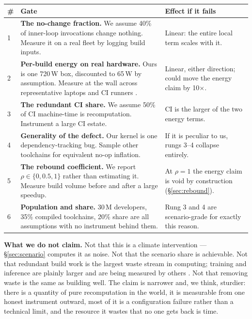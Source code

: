 \documentclass[11pt,a4paper]{article}
\providecommand{\textcite}[1]{\cite{#1}}
\begin{document}
\begin{center}\small{}\begin{tabularx}{\textwidth}{@{}lXl@{}}\toprule
\# & Gate & Effect if it fails \\\midrule
1 & \textbf{The no-change fraction.} We assume 40\% of inner-loop invocations change nothing. Measure it on a real fleet by logging build inputs. & Linear: the entire local term scales with it. \\
2 & \textbf{Per-build energy on real hardware.} Ours is one 720\,W box, discounted to 65\,W by assumption. Measure at the wall across representative laptops and CI runners \textcite{arxiv2407_11611}. & Linear, either direction; could move the energy claim by 10$\times$. \\
3 & \textbf{The redundant CI share.} We assume 50\% of CI machine-time is recomputation. Instrument a large CI estate. & CI is the larger of the two energy terms. \\
4 & \textbf{Generality of the defect.} Our kernel is one dependency-tracking bug. Sample other toolchains for equivalent no-op inflation. & If it is peculiar to us, rungs 3--4 collapse entirely. \\
5 & \textbf{The rebound coefficient.} We report $\rho\in\{0,0.5,1\}$ rather than estimating it. Measure build volume before and after a large speedup. & At $\rho=1$ the energy claim is void by construction (\S\ref{sec:rebound}). \\
6 & \textbf{Population and share.} 30\,M developers, 35\% compiled toolchains, 20\% share are all assumptions with no instrument behind them. & Rung 3 and 4 are scenario-grade for exactly this reason. \\
\bottomrule\end{tabularx}\end{center}


\textbf{What we do not claim.} Not that this is a climate intervention --- \S\ref{sec:scenario} computes it as noise. Not that the scenario share is achievable. Not that redundant build work is the largest waste stream in computing; training and inference are plainly larger and are being measured by others \textcite{arxiv2510_09022,arxiv2501_16548}. Not that removing waste is the same as building well. The claim is narrower and, we think, sturdier: there is a quantity of pure recomputation in the world, it is measurable from one honest instrument outward, most of it is a configuration failure rather than a technical limit, and the resource it wastes that no one gets back is time.
\end{document}
